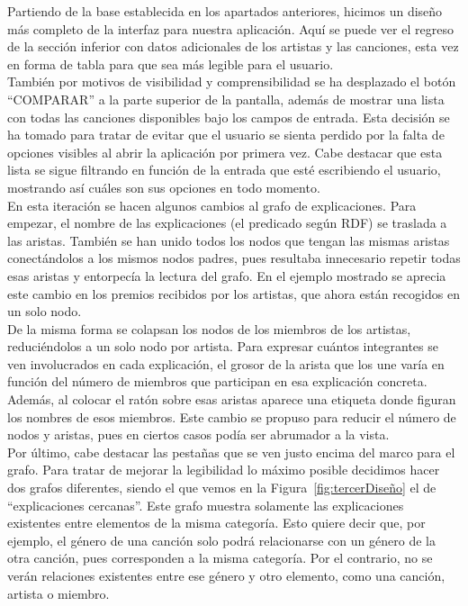 Partiendo de la base establecida en los apartados anteriores, hicimos un diseño más completo de la interfaz para nuestra aplicación. Aquí se puede ver el regreso de la sección inferior con datos adicionales de los artistas y las canciones, esta vez en forma de tabla para que sea más legible para el usuario.\\

También por motivos de visibilidad y comprensibilidad se ha desplazado el botón ``COMPARAR'' a la parte superior de la pantalla, además de mostrar una lista con todas las canciones disponibles bajo los campos de entrada. Esta decisión se ha tomado para tratar de evitar que el usuario se sienta perdido por la falta de opciones visibles al abrir la aplicación por primera vez. Cabe destacar que esta lista se sigue filtrando en función de la entrada que esté escribiendo el usuario, mostrando así cuáles son sus opciones en todo momento.\\

En esta iteración se hacen algunos cambios al grafo de explicaciones. Para empezar, el nombre de las explicaciones (el predicado según RDF) se traslada a las aristas. También se han unido todos los nodos que tengan las mismas aristas conectándolos a los mismos nodos padres, pues resultaba innecesario repetir todas esas aristas y entorpecía la lectura del grafo. En el ejemplo mostrado se aprecia este cambio en los premios recibidos por los artistas, que ahora están recogidos en un solo nodo.\\

De la misma forma se colapsan los nodos de los miembros de los artistas, reduciéndolos a un solo nodo por artista. Para expresar cuántos integrantes se ven involucrados en cada explicación, el grosor de la arista que los une varía en función del número de miembros que participan en esa explicación concreta. Además, al colocar el ratón sobre esas aristas aparece una etiqueta donde figuran los nombres de esos miembros. Este cambio se propuso para reducir el número de nodos y aristas, pues en ciertos casos podía ser abrumador a la vista.\\

Por último, cabe destacar las pestañas que se ven justo encima del marco para el grafo. Para tratar de mejorar la legibilidad lo máximo posible decidimos hacer dos grafos diferentes, siendo el que vemos en la Figura~\ref{fig:tercerDiseño} el de ``explicaciones cercanas''. Este grafo muestra solamente las explicaciones existentes entre elementos de la misma categoría. Esto quiere decir que, por ejemplo, el género de una canción solo podrá relacionarse con un género de la otra canción, pues corresponden a la misma categoría. Por el contrario, no se verán relaciones existentes entre ese género y otro elemento, como una canción, artista o miembro.\\

